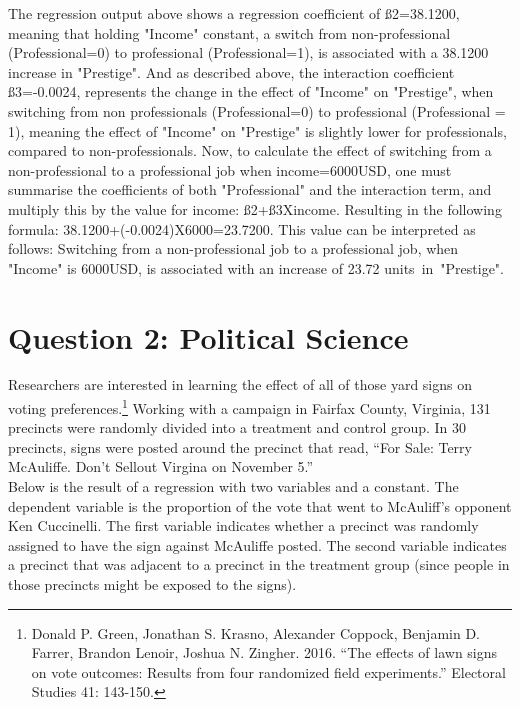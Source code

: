 \documentclass[12pt,letterpaper]{article}
\begin{document}
\begin{enumerate}
	
	The regression output above shows a regression coefficient of ß2=38.1200, meaning that holding "Income" constant, a switch from non-professional (Professional=0) to professional (Professional=1), is associated with a 38.1200 increase in "Prestige". And as described above, the interaction coefficient ß3=-0.0024, represents the change in the effect of "Income" on "Prestige", when switching from non professionals (Professional=0) to professional (Professional = 1), meaning the effect of "Income" on "Prestige" is slightly lower for professionals, compared to non-professionals. Now, to calculate the effect of switching from a non-professional to a professional job when income=6000USD, one must summarise the coefficients of both "Professional" and the interaction term, and multiply this by the value for income: ß2+ß3Xincome. Resulting in the following formula: 38.1200+(-0.0024)X6000=23.7200. This value can be interpreted as follows: Switching from a non-professional job to a professional job, when "Income" is 6000USD, is associated with an increase of 23.72 units in "Prestige".

\end{enumerate}

\newpage

\section*{Question 2: Political Science}
\vspace{.25cm}
\noindent 	Researchers are interested in learning the effect of all of those yard signs on voting preferences.\footnote{Donald P. Green, Jonathan	S. Krasno, Alexander Coppock, Benjamin D. Farrer,	Brandon Lenoir, Joshua N. Zingher. 2016. ``The effects of lawn signs on vote outcomes: Results from four randomized field experiments.'' Electoral Studies 41: 143-150. } Working with a campaign in Fairfax County, Virginia, 131 precincts were randomly divided into a treatment and control group. In 30 precincts, signs were posted around the precinct that read, ``For Sale: Terry McAuliffe. Don't Sellout Virgina on November 5.'' \\

Below is the result of a regression with two variables and a constant.  The dependent variable is the proportion of the vote that went to McAuliff's opponent Ken Cuccinelli. The first variable indicates whether a precinct was randomly assigned to have the sign against McAuliffe posted. The second variable indicates
a precinct that was adjacent to a precinct in the treatment group (since people in those precincts might be exposed to the signs).  \\
\end{document}
